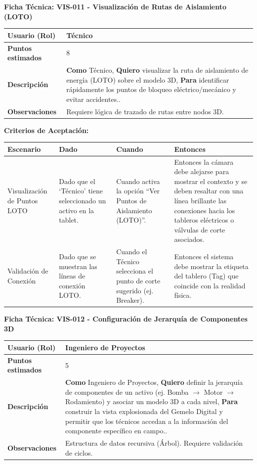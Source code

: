 \noindent
\textbf{Ficha Técnica: VIS-011 - Visualización de Rutas de Aislamiento (LOTO)}
\footnotesize
\begin{longtable}{|p{}|p{}|}
\hline
\textbf{Usuario (Rol)} & Técnico \\ \hline
\textbf{Puntos estimados} & 8 \\ \hline
\textbf{Descripción} & \textbf{Como} Técnico, \textbf{Quiero} visualizar la ruta de aislamiento de energía (LOTO) sobre el modelo 3D, \textbf{Para} identificar rápidamente los puntos de bloqueo eléctrico/mecánico y evitar accidentes.. \\ \hline
\textbf{Observaciones} & Requiere lógica de trazado de rutas entre nodos 3D. \\ \hline
\end{longtable}
\normalsize

\noindent
\textbf{Criterios de Aceptación:}
\footnotesize
\begin{longtable}{|p{}|p{}|p{}|p{}|}
\hline
\textbf{Escenario} & \textbf{Dado} & \textbf{Cuando} & \textbf{Entonces} \\ \hline
\endhead
Visualización de Puntos LOTO & Dado que el `Técnico' tiene seleccionado un activo en la tablet. & Cuando activa la opción ``Ver Puntos de Aislamiento (LOTO)''. & Entonces la cámara debe alejarse para mostrar el contexto y se deben resaltar con una línea brillante las conexiones hacia los tableros eléctricos o válvulas de corte asociados. \\ \hline
Validación de Conexión & Dado que se muestran las líneas de conexión LOTO. & Cuando el Técnico selecciona el punto de corte sugerido (ej. Breaker). & Entonces el sistema debe mostrar la etiqueta del tablero (Tag) que coincide con la realidad física. \\ \hline
\end{longtable}
\normalsize

\noindent
\textbf{Ficha Técnica: VIS-012 - Configuración de Jerarquía de Componentes 3D}
\footnotesize
\begin{longtable}{|p{}|p{}|}
\hline
\textbf{Usuario (Rol)} & Ingeniero de Proyectos \\ \hline
\textbf{Puntos estimados} & 5 \\ \hline
\textbf{Descripción} & \textbf{Como} Ingeniero de Proyectos, \textbf{Quiero} definir la jerarquía de componentes de un activo (ej. Bomba $\to$ Motor $\to$ Rodamiento) y asociar un modelo 3D a cada nivel, \textbf{Para} construir la vista explosionada del Gemelo Digital y permitir que los técnicos accedan a la información del componente específico en campo.. \\ \hline
\textbf{Observaciones} & Estructura de datos recursiva (Árbol). Requiere validación de ciclos. \\ \hline
\end{longtable}
\normalsize

